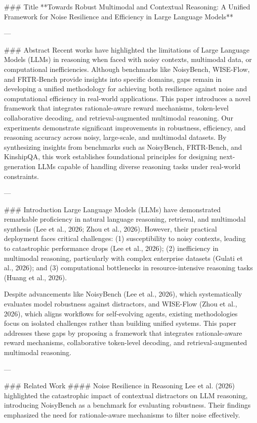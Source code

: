 ### Title  
**Towards Robust Multimodal and Contextual Reasoning: A Unified Framework for Noise Resilience and Efficiency in Large Language Models**  

---

### Abstract  
Recent works have highlighted the limitations of Large Language Models (LLMs) in reasoning when faced with noisy contexts, multimodal data, or computational inefficiencies. Although benchmarks like NoisyBench, WISE-Flow, and FRTR-Bench provide insights into specific domains, gaps remain in developing a unified methodology for achieving both resilience against noise and computational efficiency in real-world applications. This paper introduces a novel framework that integrates rationale-aware reward mechanisms, token-level collaborative decoding, and retrieval-augmented multimodal reasoning. Our experiments demonstrate significant improvements in robustness, efficiency, and reasoning accuracy across noisy, large-scale, and multimodal datasets. By synthesizing insights from benchmarks such as NoisyBench, FRTR-Bench, and KinshipQA, this work establishes foundational principles for designing next-generation LLMs capable of handling diverse reasoning tasks under real-world constraints.  

---

### Introduction  
Large Language Models (LLMs) have demonstrated remarkable proficiency in natural language reasoning, retrieval, and multimodal synthesis (Lee et al., 2026; Zhou et al., 2026). However, their practical deployment faces critical challenges: (1) susceptibility to noisy contexts, leading to catastrophic performance drops (Lee et al., 2026); (2) inefficiency in multimodal reasoning, particularly with complex enterprise datasets (Gulati et al., 2026); and (3) computational bottlenecks in resource-intensive reasoning tasks (Huang et al., 2026).  

Despite advancements like NoisyBench (Lee et al., 2026), which systematically evaluates model robustness against distractors, and WISE-Flow (Zhou et al., 2026), which aligns workflows for self-evolving agents, existing methodologies focus on isolated challenges rather than building unified systems. This paper addresses these gaps by proposing a framework that integrates rationale-aware reward mechanisms, collaborative token-level decoding, and retrieval-augmented multimodal reasoning.  

---

### Related Work  
#### Noise Resilience in Reasoning  
Lee et al. (2026) highlighted the catastrophic impact of contextual distractors on LLM reasoning, introducing NoisyBench as a benchmark for evaluating robustness. Their findings emphasized the need for rationale-aware mechanisms to filter noise effectively.  

